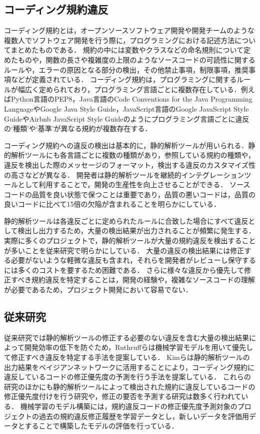 \documentclass[paper]{ieicej}
\begin{document}
\subsection{コーディング規約違反}

コーディング規約とは，オープンソースソフトウェア開発や開発チームのような複数人でソフトウェア開発を行う際に，プログラミングにおける記述方法についてまとめたものである．
規約の中には変数やクラスなどの命名規則について定めたものや，関数の長さや複雑度の上限のようなソースコードの可読性に関するルールや，エラーの原因となる部分の検出，その他禁止事項，制限事項，推奨事項などが定義されている．
コーディング規約は，プログラミングに関するルールが幅広く定められており，プログラミング言語ごとに複数存在している．例えばPython言語のPEP8，Java言語のCode Conventions for the Java Programming LanguageやGoogle Java Style Guide，JavaScript言語のGoogle JavaScript Style GuideやAirbnb JavaScript Style Guideのようにプログラミング言語ごとに違反の`種類'や`基準'が異なる規約が複数存在する．

コーディング規約への違反の検出は基本的に，静的解析ツールが用いられる．静的解析ツールにも各言語ごとに複数の種類があり，参照している規約の種類や，違反を検出した際のメッセージのフォーマット，検出する違反のカスタマイズ性の高さなどが異なる．
開発者は静的解析ツールを継続的インテグレーションツールとして利用することで，開発の生産性を向上させることができる．
ソースコードの品質を良い状態で保つことは重要であり，品質の悪いコードは，品質の良いコードに比べて15倍の欠陥が含まれることを明らかにしている\cite{静的解析ツールの効果}．

静的解析ツールは各違反ごとに定められたルールに合致した場合にすべて違反として検出し出力するため，大量の検出結果が出力されることが頻繁に発生する．実際に多くのプロジェクトで，静的解析ツールが大量の規約違反を検出することが多いことを従来研究で明らかにしている\cite{UsingStaticAnalysisTools2}．
大量の違反の検出結果には修正する必要がないような軽微な違反も含まれ，それらを開発者がレビューし保守するには多くのコストを要するため困難である．
さらに様々な違反から優先して修正すべき規約違反を特定することは，開発の経験や，複雑なソースコードの理解が必要であるため，プロジェクト開発において容易でない\cite{shuseisarenai}．


\subsection{従来研究}

従来研究では静的解析ツールの修正する必要のない違反を含む大量の検出結果によって開発効率の低下を防ぐため，Ruthruffらは機械学習モデルを用いて優先して修正すべき違反を特定する手法を提案している\cite{JyuraiPre}．
Kimらは静的解析ツールの出力結果をベイジアンネットワークに活用することにより，コーディング規約に違反しているコードの修正優先度の予測を行う手法を提案している\cite{beizu}．
これらの研究のほかにも静的解析ツールによって検出された規約に違反しているコードの修正優先度付けを行う研究や，修正の要否を予測する研究は数多く行われている\cite{Wang}\cite{Qing}\cite{HowFar}．
機械学習のモデル構築には，規約違反コードの修正優先度予測対象のプロジェクトの過去の規約違反修正履歴を学習データとし，新しいデータを評価用データとすることで構築したモデルの評価を行っている．
\end{document}
